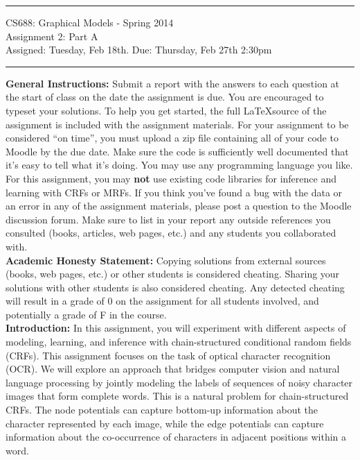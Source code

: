 \documentclass[11pt]{article}
\begin{document}
{\centering
  \rule{6.3in}{2pt}
  \vspace{1em}
  {\Large
    CS688: Graphical Models - Spring 2014\\
    Assignment 2: Part A\\
  }
  \vspace{1em}
  Assigned: Tuesday, Feb 18th. Due: Thursday, Feb 27th 2:30pm\\
  \vspace{0.1em}
  \rule{6.3in}{1.5pt}
}\vspace{1em}

\textbf{General Instructions:} Submit a report with the answers to each question at the start of class on the date the assignment is due. You are encouraged to typeset your solutions. To help you get started, the full \LaTeX source of the assignment is included with the assignment materials. For your assignment to be considered ``on time'', you must upload a zip file containing all of your code to Moodle by the due date. Make sure the code is sufficiently well documented that it's easy to tell what it's doing. You may use any programming language you like. For this assignment, you may \textbf{not} use existing code libraries for inference and learning with CRFs or MRFs. If you think you've found a bug with the data or an error in any of the assignment materials, please post a question to the Moodle discussion forum. Make sure to list in your report any outside references you consulted (books, articles, web pages, etc.) and any students you collaborated with.\\

\textbf{Academic Honesty Statement:} Copying solutions from external sources (books, web pages, etc.) or other students is considered cheating. Sharing your solutions with other students is also considered cheating. Any detected cheating will result in a grade of 0 on the assignment for all students involved, and potentially a grade of F in the course.\\

\textbf{Introduction:} In this assignment, you will experiment with different aspects of modeling, learning, and inference with chain-structured conditional random fields (CRFs). This assignment focuses on the task of 
optical character recognition (OCR). We will explore an approach that bridges computer vision and natural language processing by jointly modeling the labels of sequences of noisy character images that form complete words. This is a natural problem for chain-structured CRFs. The node potentials can capture bottom-up information about the character represented by each image, while the edge potentials can capture information about the co-occurrence of characters in adjacent positions within a word. 
\\
\end{document}
